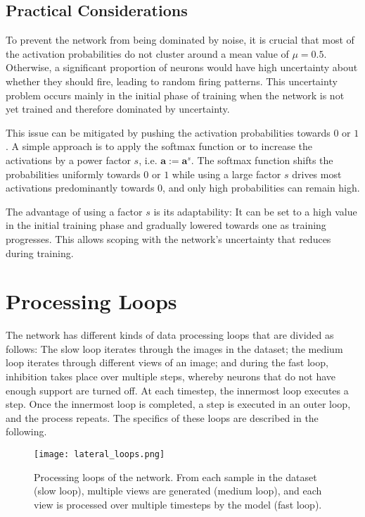 \subsection{Practical Considerations}
To prevent the network from being dominated by noise, it is crucial that most of the activation probabilities do not cluster around a mean value of $\mu = 0.5$. Otherwise, a significant proportion of neurons would have high uncertainty about whether they should fire, leading to random firing patterns. This uncertainty problem occurs mainly in the initial phase of training when the network is not yet trained and therefore dominated by uncertainty.

This issue can be mitigated by pushing the activation probabilities towards $0$ or $1$. A simple approach is to apply the softmax function or to increase the activations by a power factor $s$, i.e. $\boldsymbol{a} := \boldsymbol{a}^s$. The softmax function shifts the probabilities uniformly towards $0$ or $1$ while using a large factor $s$ drives most activations predominantly towards $0$, and only high probabilities can remain high.

The advantage of using a factor $s$ is its adaptability: It can be set to a high value in the initial training phase and gradually lowered towards one as training progresses. This allows scoping with the network's uncertainty that reduces during training.


\section{Processing Loops}
The network has different kinds of data processing loops that are divided as follows:
The slow loop iterates through the images in the dataset; the medium loop iterates through different views of an image; and during the fast loop, inhibition takes place over multiple steps, whereby neurons that do not have enough support are turned off.
At each timestep, the innermost loop executes a step. Once the innermost loop is completed, a step is executed in an outer loop, and the process repeats. The specifics of these loops are described in the following.

\begin{figure}[h]
    \centering
    \texttt{[image: lateral\_loops.png]}
    \caption[Processing loops of the network]{Processing loops of the network. From each sample in the dataset (slow loop), multiple views are generated (medium loop), and each view is processed over multiple timesteps by the model (fast loop).}
\end{figure}

